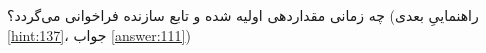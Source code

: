 \section{}
\paragraph{}\label{hint:79}
چه زمانی  مقداردهی اولیه شده و تابع سازنده فراخوانی می‌گردد؟ (راهنماییِ بعدی \ref{hint:137}، جواب \ref{answer:111})